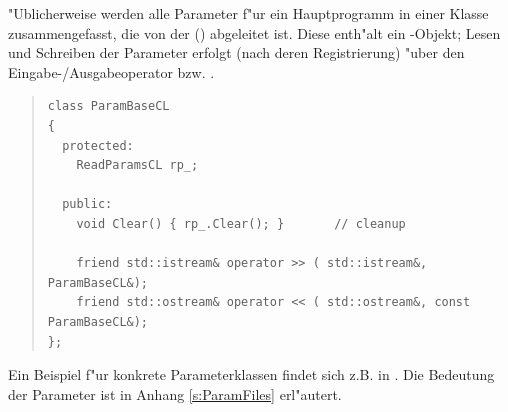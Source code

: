 \documentclass[11pt,a4paper]{article}
\newenvironment{Code}{\begin{quote}\scriptsize}{\end{quote}}
\begin{document}
"Ublicherweise werden alle Parameter f"ur ein Hauptprogramm in einer Klasse
zusammengefasst, die von der  () abgeleitet
ist. Diese enth"alt ein -Objekt; Lesen und Schreiben der
Parameter erfolgt (nach deren Registrierung) "uber den Eingabe-/Ausgabeoperator 
\prg{>>} bzw. \prg{<<}.
\begin{Code}
\begin{verbatim}
class ParamBaseCL
{
  protected:
    ReadParamsCL rp_;
    
  public:
    void Clear() { rp_.Clear(); }		// cleanup

    friend std::istream& operator >> ( std::istream&, ParamBaseCL&);
    friend std::ostream& operator << ( std::ostream&, const ParamBaseCL&);
};
\end{verbatim}
\end{Code}
Ein Beispiel f"ur konkrete Parameterklassen findet sich z.B. in 
. Die Bedeutung der Parameter ist in Anhang
\ref{s:ParamFiles} 
erl"autert.



				\appendix


\end{document}
